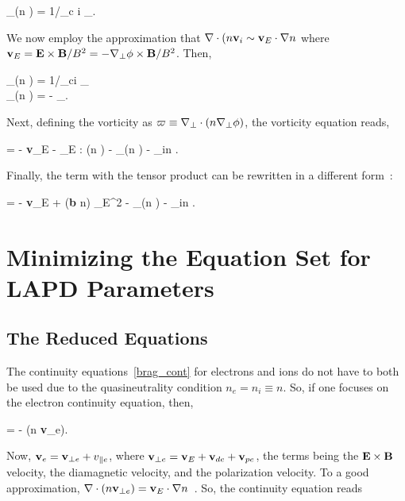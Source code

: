 \beq
\label{simp_charge_cons1}
\nabla_\para (n \vpe) = 1/\omega_{c i} \nabla_\perp \cdot {}.
\eeq

We now employ the approximation that $\nabla \cdot (n {\bf v}_i \sim {\bf v}_E \cdot \nabla n$ where ${\bf v}_E = {\bf E} \times {\bf B}/B^2 = - \nabla_\perp \phi \times {\bf B}/B^2$. Then,

\beqar
\label{simp_charge_cons2}
\nabla_\para (n \vpe) = 1/\omega_{ci} \nabla_\perp \cdot {} \\ \nonumber
\nabla_\para (n \vpe) = -  \nabla_\perp \cdot {}.
\eeqar

Next, defining the vorticity as $\varpi \equiv \nabla_\perp \cdot (n \nabla_\perp \phi)$, the vorticity equation reads,

\beq
\label{vort_eqn1}
 = - {\bf v}_E \cdot \gradperp \varpi - _E : \gradperp (n \gradperp \phi) -  \grad_\para (n \vpe) - \nu_{in} \varpi.
\eeq

Finally, the term with the tensor product can be rewritten in a different form~\cite{Popovich2010a}:

\beq
\label{vort_eqn2}
 = - {\bf v}_E \cdot \gradperp \varpi +  ({\bf b} \times \gradperp n) \cdot {}_E^2   -  \grad_\para (n \vpe) - \nu_{in} \varpi.
\eeq


\section{Minimizing the Equation Set for LAPD Parameters}
\label{s_reduced_eqns}

\subsection{The Reduced Equations}
\label{ss_reduced_eqns}

The continuity equations~\ref{brag_cont} for electrons and ions do not have to both be used due to the quasineutrality condition $n_e = n_i \equiv n$. So, if one focuses on the electron
continuity equation, then,

\beq
\label{cont1}
 = - \grad \cdot (n {\bf v}_e).
\eeq

Now, ${\bf v}_e = {\bf v}_{\perp e} + v_{\parallel e}$, where ${\bf v}_{\perp e} = {\bf v}_{E} + {\bf v}_{d e} + {\bf v}_{p e}$, the terms being the ${\bf E \times B}$ velocity, the diamagnetic velocity,
and the polarization velocity. To a good approximation, $\nabla \cdot (n {\bf v}_{\perp e}) = {\bf v}_{E} \cdot \nabla n$~\cite{Popovich2010a,simakov2003}. So, the continuity equation reads


